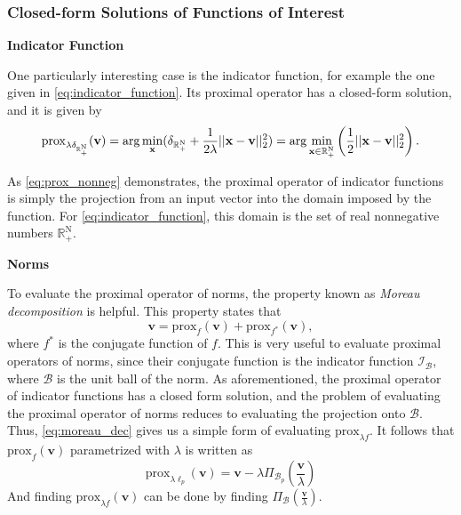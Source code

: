 \subsubsection{Closed-form Solutions of Functions of Interest} \label{sect:prox_solutions}

\noindent\textbf{Indicator Function}

One particularly interesting case is the indicator function, for example the one given in  \eqref{eq:indicator_function}. Its proximal operator has a closed-form solution, and it is given by
\begin{equation}
\mathrm{prox}_{\lambda \delta_{\rm \mathbb{R}_+^N}}(\mathbf{v}) = \arg \min_\mathbf{x}(\delta_{\rm \mathbb{R}_+^N}+\frac{1}{2\lambda}||\mathbf{x} - \mathbf{v}||_2^2) = \arg \min_{\mathbf{x}\in \rm \mathbb{R}_+^N}\left(\frac{1}{2}||\mathbf{x} - \mathbf{v}||_2^2\right).
    \label{eq:prox_nonneg}
\end{equation}

As  \eqref{eq:prox_nonneg} demonstrates, the proximal operator of indicator functions is simply the projection from an input vector into the domain imposed by the function. For  \eqref{eq:indicator_function}, this domain is the set of real nonnegative numbers $\mathbb{R}_+^\mathrm{N}$. 

\noindent\textbf{Norms}

To evaluate the proximal operator of norms, the property known as \textit{Moreau decomposition} \cite{parikh_proximal_2014} is helpful. This property states that
\begin{equation}
\mathbf{v} = \mathrm{prox}_f(\mathbf{v}) + \mathrm{prox}_{f^*}(\mathbf{v}),
    \label{eq:moreau_dec}
\end{equation}
where $f^*$ is the conjugate function of $f$. This is very useful to evaluate proximal operators of norms, since their conjugate function is the indicator function $\mathcal{I}_{\mathcal{B}}$, where $\mathcal{B}$ is the unit ball of the norm. As aforementioned, the proximal operator of indicator functions has a closed form solution, and the problem of evaluating the proximal operator of norms reduces to evaluating the projection onto $\mathcal{B}$. Thus, \eqref{eq:moreau_dec} gives us a simple form of evaluating $\mathrm{prox}_{\lambda f}$. It follows that $\mathrm{prox}_f(\mathbf{v})$ parametrized with $\lambda$ is written as
\begin{equation}
\mathrm{prox}_{\lambda\ell_p}(\mathbf{v}) = \mathbf{v} - \lambda \Pi_{\mathcal{B}_p}(\frac{\mathbf{v}}{\lambda})
    \label{eq:norm_prox}
\end{equation}
And finding $\mathrm{prox}_{\lambda f}(\mathbf{v})$ can be done by finding $\Pi_{\mathcal{B}}(\frac{\mathbf{v}}{\lambda})$. 

